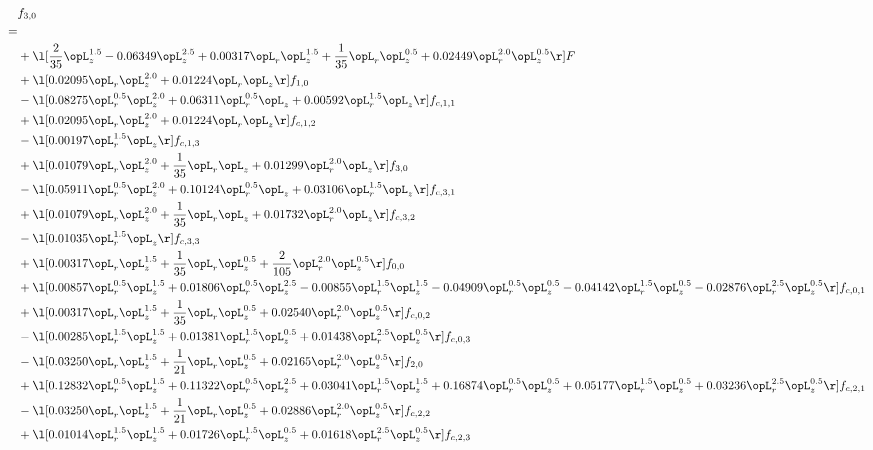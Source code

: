 \begin{alignat}{2} 
\label{eq:f_30_1} 
& f_{3,0} \nonumber \\ 
 = \\ 
& + \l[ \frac{2}{35} \opL_z^{1.5}   -0.06349 \opL_z^{2.5} +  0.00317 \opL_r \opL_z^{1.5} + \frac{1}{35} \opL_r \opL_z^{0.5} +  0.02449 \opL_r^{2.0} \opL_z^{0.5}  \r] F \nonumber \\ 
& + \l[  0.02095 \opL_r \opL_z^{2.0} +  0.01224 \opL_r \opL_z  \r] f_{1,0} \nonumber \\ 
& - \l[  0.08275 \opL_r^{0.5} \opL_z^{2.0} +  0.06311 \opL_r^{0.5} \opL_z +  0.00592 \opL_r^{1.5} \opL_z  \r] f_{c,1,1} \nonumber \\ 
& + \l[  0.02095 \opL_r \opL_z^{2.0} +  0.01224 \opL_r \opL_z  \r] f_{c,1,2} \nonumber \\ 
& - \l[  0.00197 \opL_r^{1.5} \opL_z  \r] f_{c,1,3} \nonumber \\ 
& + \l[  0.01079 \opL_r \opL_z^{2.0} + \frac{1}{35} \opL_r \opL_z +  0.01299 \opL_r^{2.0} \opL_z  \r] f_{3,0} \nonumber \\ 
& - \l[  0.05911 \opL_r^{0.5} \opL_z^{2.0} +  0.10124 \opL_r^{0.5} \opL_z +  0.03106 \opL_r^{1.5} \opL_z  \r] f_{c,3,1} \nonumber \\ 
& + \l[  0.01079 \opL_r \opL_z^{2.0} + \frac{1}{35} \opL_r \opL_z +  0.01732 \opL_r^{2.0} \opL_z  \r] f_{c,3,2} \nonumber \\ 
& - \l[  0.01035 \opL_r^{1.5} \opL_z  \r] f_{c,3,3} \nonumber \\ 
& + \l[  0.00317 \opL_r \opL_z^{1.5} + \frac{1}{35} \opL_r \opL_z^{0.5} + \frac{2}{105} \opL_r^{2.0} \opL_z^{0.5}  \r] f_{0,0} \nonumber \\ 
& + \l[  0.00857 \opL_r^{0.5} \opL_z^{1.5} +  0.01806 \opL_r^{0.5} \opL_z^{2.5}   -0.00855 \opL_r^{1.5} \opL_z^{1.5}   -0.04909 \opL_r^{0.5} \opL_z^{0.5}   -0.04142 \opL_r^{1.5} \opL_z^{0.5}   -0.02876 \opL_r^{2.5} \opL_z^{0.5}  \r] f_{c,0,1} \nonumber \\ 
& + \l[  0.00317 \opL_r \opL_z^{1.5} + \frac{1}{35} \opL_r \opL_z^{0.5} +  0.02540 \opL_r^{2.0} \opL_z^{0.5}  \r] f_{c,0,2} \nonumber \\ 
& - \l[  0.00285 \opL_r^{1.5} \opL_z^{1.5} +  0.01381 \opL_r^{1.5} \opL_z^{0.5} +  0.01438 \opL_r^{2.5} \opL_z^{0.5}  \r] f_{c,0,3} \nonumber \\ 
& - \l[  0.03250 \opL_r \opL_z^{1.5} + \frac{1}{21} \opL_r \opL_z^{0.5} +  0.02165 \opL_r^{2.0} \opL_z^{0.5}  \r] f_{2,0} \nonumber \\ 
& + \l[  0.12832 \opL_r^{0.5} \opL_z^{1.5} +  0.11322 \opL_r^{0.5} \opL_z^{2.5} +  0.03041 \opL_r^{1.5} \opL_z^{1.5} +  0.16874 \opL_r^{0.5} \opL_z^{0.5} +  0.05177 \opL_r^{1.5} \opL_z^{0.5} +  0.03236 \opL_r^{2.5} \opL_z^{0.5}  \r] f_{c,2,1} \nonumber \\ 
& - \l[  0.03250 \opL_r \opL_z^{1.5} + \frac{1}{21} \opL_r \opL_z^{0.5} +  0.02886 \opL_r^{2.0} \opL_z^{0.5}  \r] f_{c,2,2} \nonumber \\ 
& + \l[  0.01014 \opL_r^{1.5} \opL_z^{1.5} +  0.01726 \opL_r^{1.5} \opL_z^{0.5} +  0.01618 \opL_r^{2.5} \opL_z^{0.5}  \r] f_{c,2,3} \nonumber \\ 
\end{alignat} 


